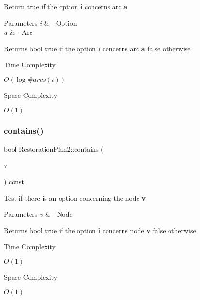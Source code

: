Return true if the option {\bfseries i} concerns arc {\bfseries a} 


\begin{DoxyParams}{Parameters}
{\em i} & -\/ Option \\
\hline
{\em a} & -\/ Arc \\
\hline
\end{DoxyParams}
\begin{DoxyReturn}{Returns}
bool true if the option {\bfseries i} concerns arc {\bfseries a} false otherwise 
\end{DoxyReturn}
\begin{DoxyRefDesc}{Time Complexity}
\item[\hyperlink{time__time000010}{Time Complexity}]$O(\log \#arcs(i))$ \end{DoxyRefDesc}
\begin{DoxyRefDesc}{Space Complexity}
\item[\hyperlink{space__space000010}{Space Complexity}]$O(1)$ \end{DoxyRefDesc}
\mbox{\label{class_restoration_plan2_a753668d5ba34ea1e088aee85218543b7}} 
\subsubsection{\texorpdfstring{contains()}{contains()}\hspace{0.1cm}{\footnotesize\ttfamily [3/4]}}
{\footnotesize\ttfamily bool Restoration\+Plan2\+::contains (\begin{DoxyParamCaption}\item[{Graph\+\_\+t\+::\+Node}]{v }\end{DoxyParamCaption}) const\hspace{0.3cm}{\ttfamily [inline]}}



Test if there is an option concerning the node {\bfseries v} 


\begin{DoxyParams}{Parameters}
{\em v} & -\/ Node \\
\hline
\end{DoxyParams}
\begin{DoxyReturn}{Returns}
bool true if the option {\bfseries i} concerns node {\bfseries v} false otherwise 
\end{DoxyReturn}
\begin{DoxyRefDesc}{Time Complexity}
\item[\hyperlink{time__time000011}{Time Complexity}]$O(1)$ \end{DoxyRefDesc}
\begin{DoxyRefDesc}{Space Complexity}
\item[\hyperlink{space__space000011}{Space Complexity}]$O(1)$ \end{DoxyRefDesc}
\mbox{\label{class_restoration_plan2_acac88b4dcb361cf6ca3061457ff05bfa}} 
